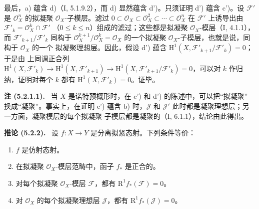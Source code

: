 \documentclass[UTF8,fontset=none,11pt,oneside,openany]{ctexbook}
\newenvironment{corollary}[1][]{\par\medskip\noindent\textbf{推论 (#1).}\ }{\par}
\newenvironment{remark}[1][]{\par\medskip\noindent\textbf{注 (#1).}\ }{\par}
\newcommand{\egaxref}[2]{\textup{#2}}
\let\EGAOriginalLabel\label
\renewcommand{\label}[1]{\phantomsection\EGAOriginalLabel{#1}}
\begin{document}
最后，a) 蕴含 d)（\egaxref{I.5.1.9.2-zh}{I, 5.1.9.2}），而 d)
显然蕴含 d')。只须证明 d') 蕴含 c')。设 $\mathcal{F}'$ 是
$\mathcal{O}_X^n$ 的拟凝聚 $\mathcal{O}_X$-子模层。滤过
$0\subset\mathcal{O}_X\subset\mathcal{O}_X^2\subset\cdots\subset
\mathcal{O}_X^n$ 在 $\mathcal{F}'$ 上诱导出由
$\mathcal{F}'_k=\mathcal{O}_X^k\cap\mathcal{F}'$
（$0\leq k\leq n$）组成的滤过；这些都是拟凝聚
$\mathcal{O}_X$-模层（\egaxref{I.4.1.1-zh}{I, 4.1.1}），而
$\mathcal{F}'_{k+1}/\mathcal{F}'_k$ 同构于
$\mathcal{O}_X^{k+1}/\mathcal{O}_X^k=\mathcal{O}_X$ 的一个拟凝聚
$\mathcal{O}_X$-子模层，也就是说，同构于 $\mathcal{O}_X$ 的一个
拟凝聚理想层。因此，假设 d') 蕴含
$\mathrm{H}^1(X,\mathcal{F}'_{k+1}/\mathcal{F}'_k)=0$；于是由
上同调正合列
$\mathrm{H}^1(X,\mathcal{F}'_k)\to\mathrm{H}^1(X,\mathcal{F}'_{k+1})
\to\mathrm{H}^1(X,\mathcal{F}'_{k+1}/\mathcal{F}'_k)=0$，可以对 $k$
作归纳，证明对每个 $k$ 都有
$\mathrm{H}^1(X,\mathcal{F}'_k)=0$。证毕。

\begin{remark}[5.2.1.1]
\label{II.5.2.1.1-zh}
当 $X$ 是诺特预概形时，在 c') 和 d') 的陈述中，可以把“拟凝聚”
换成“凝聚”。事实上，在证明 c') 蕴含 b) 时，$\mathcal{J}$ 和
$\mathcal{J}'$ 此时都是凝聚理想层；另一方面，凝聚模层的每个拟凝聚
子模层都是凝聚的（\egaxref{I.6.1.1-zh}{I, 6.1.1}），结论由此得出。
\end{remark}

\begin{corollary}[5.2.2]
\label{II.5.2.2-zh}
设 $f:X\to Y$ 是分离拟紧态射。下列条件等价：
\begin{enumerate}
  \item[\rm{a)}] $f$ 是仿射态射。
  \item[\rm{b)}] 在拟凝聚 $\mathcal{O}_X$-模层范畴中，函子 $f_*$
  是正合的。
  \item[\rm{c)}] 对每个拟凝聚 $\mathcal{O}_X$-模层
  $\mathcal{F}$，都有 $\mathrm{R}^1f_*(\mathcal{F})=0$。
  \item[\rm{c')}] 对 $\mathcal{O}_X$ 的每个拟凝聚理想层
  $\mathcal{J}$，都有 $\mathrm{R}^1f_*(\mathcal{J})=0$。
\end{enumerate}
\end{corollary}
\end{document}
